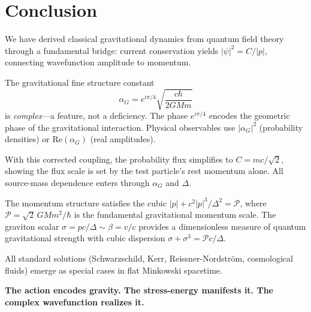 \documentclass[11pt,a4paper]{article}
\theoremstyle{definition}
\theoremstyle{remark}
\begin{document}
	\section{Conclusion}
	
	We have derived classical gravitational dynamics from quantum field theory through a fundamental bridge: current conservation yields $|\psi|^2=C/|p|$, connecting wavefunction amplitude to momentum.
	
	The gravitational fine structure constant
	\begin{equation*}
		\alpha_G = e^{i\pi/4}\sqrt{\frac{c\hbar}{2GMm}}
	\end{equation*}
	is \emph{complex}---a feature, not a deficiency.  The phase $e^{i\pi/4}$ encodes the geometric phase of the gravitational interaction.  Physical observables use $|\alpha_G|^2$ (probability densities) or $\mathrm{Re}(\alpha_G)$ (real amplitudes).
	
	With this corrected coupling, the probability flux simplifies to $C=mc/\sqrt{2}$, showing the flux scale is set by the test particle's rest momentum alone.  All source-mass dependence enters through $\alpha_G$ and $\Delta$.
	
	The momentum structure satisfies the cubic $|p|+c^2|p|^3/\Delta^2=\mathcal{P}$, where $\mathcal{P}=\sqrt{2}\,GMm^2/\hbar$ is the fundamental gravitational momentum scale.  The graviton scalar $\sigma=pc/\Delta\sim\beta=v/c$ provides a dimensionless measure of quantum gravitational strength with cubic dispersion $\sigma+\sigma^3=\mathcal{P}c/\Delta$.
	
	All standard solutions (Schwarzschild, Kerr, Reissner-Nordstr\"om, cosmological fluids) emerge as special cases in flat Minkowski spacetime.
	
	\bigskip
	\noindent\textbf{The action encodes gravity.  The stress-energy manifests it.  The complex wavefunction realizes it.}
\end{document}
